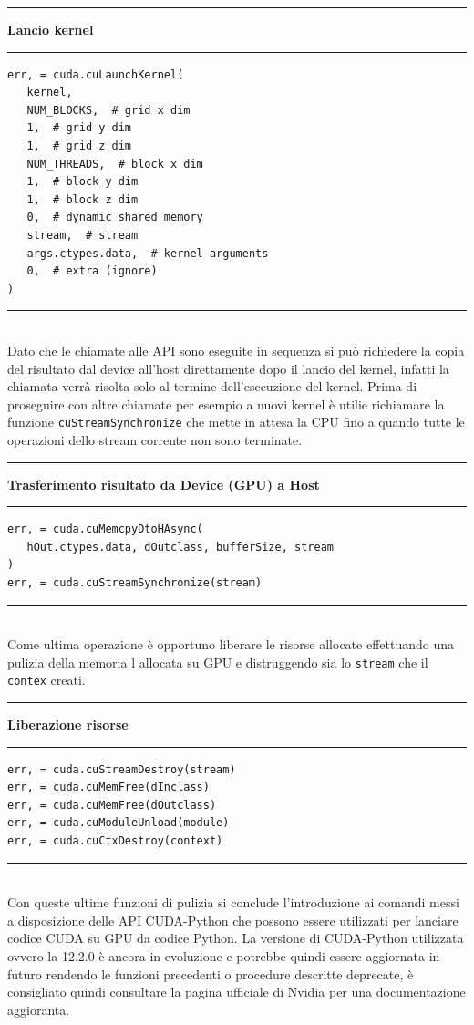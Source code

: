 \documentclass[12pt,a4paper]{report}
\begin{document}
\noindent\rule[0.5ex]{\linewidth}{2pt}
\small{\textbf{Lancio kernel}} \\
\noindent\rule[0.5ex]{\linewidth}{1pt}
\begin{lstlisting}
err, = cuda.cuLaunchKernel(
   kernel,
   NUM_BLOCKS,  # grid x dim
   1,  # grid y dim
   1,  # grid z dim
   NUM_THREADS,  # block x dim
   1,  # block y dim
   1,  # block z dim
   0,  # dynamic shared memory
   stream,  # stream
   args.ctypes.data,  # kernel arguments
   0,  # extra (ignore)
)
\end{lstlisting}
\noindent\rule[0.5ex]{\linewidth}{1pt} \\[10pt]
Dato che le chiamate alle API sono eseguite in sequenza si può richiedere la copia del risultato dal device all'host direttamente dopo il lancio del kernel, infatti la chiamata verrà risolta solo al termine dell'esecuzione del kernel. \newline
Prima di proseguire con altre chiamate per esempio a nuovi kernel è utilie richiamare la funzione \verb|cuStreamSynchronize| che mette in attesa la CPU fino a quando tutte le operazioni dello stream corrente non sono terminate. \newpage

\noindent\rule[0.5ex]{\linewidth}{2pt}
\small{\textbf{Trasferimento risultato da Device (GPU) a Host}} \\
\noindent\rule[0.5ex]{\linewidth}{1pt}
\begin{lstlisting}
err, = cuda.cuMemcpyDtoHAsync(
   hOut.ctypes.data, dOutclass, bufferSize, stream
)
err, = cuda.cuStreamSynchronize(stream)
\end{lstlisting}
\noindent\rule[0.5ex]{\linewidth}{1pt} \\[10pt]
Come ultima operazione è opportuno liberare le risorse allocate effettuando una pulizia della memoria l allocata su GPU e distruggendo sia lo \verb|stream| che il \verb|contex| creati. \newline

\noindent\rule[0.5ex]{\linewidth}{2pt}
\small{\textbf{Liberazione risorse}} \\
\noindent\rule[0.5ex]{\linewidth}{1pt}
\begin{lstlisting}
err, = cuda.cuStreamDestroy(stream)
err, = cuda.cuMemFree(dInclass)
err, = cuda.cuMemFree(dOutclass)
err, = cuda.cuModuleUnload(module)
err, = cuda.cuCtxDestroy(context)
\end{lstlisting}
\noindent\rule[0.5ex]{\linewidth}{1pt} \\[10pt]
Con queste ultime funzioni di pulizia si conclude l'introduzione ai comandi messi a disposizione delle API CUDA-Python che possono essere utilizzati per lanciare codice CUDA su GPU da codice Python. \newline
La versione di CUDA-Python utilizzata ovvero la 12.2.0 è ancora in evoluzione e potrebbe quindi essere aggiornata in futuro rendendo le funzioni precedenti o procedure descritte deprecate, è consigliato quindi consultare la pagina ufficiale di Nvidia per una documentazione aggioranta. \newpage
\end{document}
